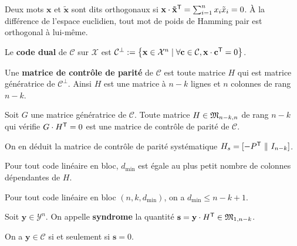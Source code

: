 	\begin{defn}
		Deux mots $\mathbf{x}$ et $\mathbf{\tilde{x}}$ sont dits orthogonaux si
		$\mathbf{x} \cdot {\mathbf{\tilde{x}}}^{\mathsf{T}} = \sum_{i = 1}^n x_i \tilde{x}_i = 0$.
		À la différence de l'espace euclidien, tout mot de poids de Hamming pair est orthogonal à lui-même.
	\end{defn}

	\begin{defn}
		Le \textbf{code dual} de $\mathcal{C}$ sur $\mathcal{X}$ est
		$\mathcal{C}^\perp := \left\{ \mathbf{x} \in \mathcal{X}^n \mid \forall \mathbf{c} \in \mathcal{C}, \mathbf{x} \cdot {\mathbf{c}}^{\mathsf{T}} = 0 \right\}$.
	\end{defn}

	\begin{defn}
		Une \textbf{matrice de contrôle de parité} de $\mathcal{C}$ est toute matrice $H$ qui est matrice génératrice de $\mathcal{C}^\perp$.
		Ainsi $H$ est une matrice à $n - k$ lignes et $n$ colonnes de rang $n - k$.
	\end{defn}

	\begin{thm}
		Soit $G$ une matrice génératrice de $\mathcal{C}$.
		Toute matrice $H \in \mathfrak{M}_{n - k, n}$ de rang $n - k$ qui vérifie $G \cdot {H}^{\mathsf{T}} = 0$ est une matrice de contrôle de parité de $\mathcal{C}$.
	\end{thm}

	On en déduit la matrice de contrôle de parité systématique $H_s = [-{P}^{\mathsf{T}} \ \Vert \ I_{n - k}]$.

	\begin{thm}
		Pour tout code linéaire en bloc, $d_{\min}$ est égale au plus petit nombre de colonnes dépendantes de $H$.
	\end{thm}

	\begin{thm}
		Pour tout code linéaire en bloc $(n,k,d_{\min})$, on a $d_{\min} \leq n - k + 1$.
	\end{thm}

	\begin{defn}
		Soit $\mathbf{y} \in \mathcal{Y}^n$.
		On appelle \textbf{syndrome} la quantité $\mathbf{s} = \mathbf{y} \cdot {H}^{\mathsf{T}} \in \mathfrak{M}_{1,n - k}$.
	\end{defn}

	\begin{pop}
		On a $\mathbf{y} \in \mathcal{C}$ si et seulement si $\mathbf{s} = 0$.
	\end{pop}

